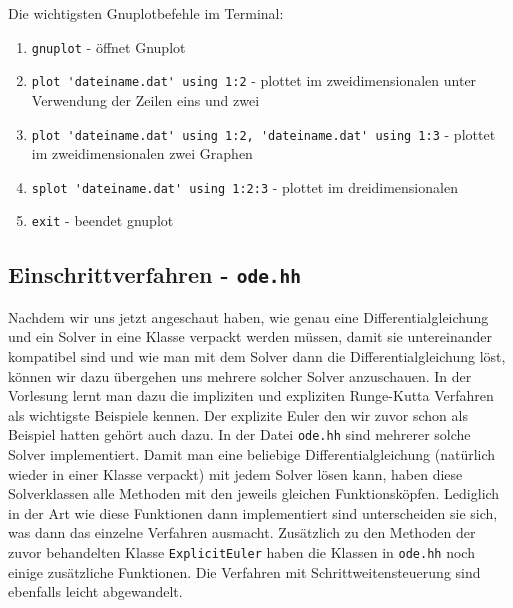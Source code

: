 \documentclass[a4paper,11pt]{article}
\theoremstyle{definition}
\begin{document}
Die wichtigsten Gnuplotbefehle im Terminal:
\begin{enumerate}
\item \lstinline{gnuplot} - öffnet Gnuplot
\item \lstinline{plot 'dateiname.dat' using 1:2} - plottet im zweidimensionalen unter Verwendung der Zeilen eins und zwei
\item \lstinline{plot 'dateiname.dat' using 1:2, 'dateiname.dat' using 1:3} - plottet im zweidimensionalen zwei Graphen
\item \lstinline{splot 'dateiname.dat' using 1:2:3} - plottet im dreidimensionalen
\item \lstinline{exit} - beendet gnuplot
\end{enumerate}


\subsection{Einschrittverfahren - \lstinline{ode.hh}}

Nachdem wir uns jetzt angeschaut haben, wie genau eine
Differentialgleichung und ein Solver in eine Klasse verpackt werden
müssen, damit sie untereinander kompatibel sind und wie man mit dem
Solver dann die Differentialgleichung löst, können wir dazu übergehen
uns mehrere solcher Solver anzuschauen. In der Vorlesung lernt man
dazu die impliziten und expliziten Runge-Kutta Verfahren als
wichtigste Beispiele kennen. Der explizite Euler den wir zuvor schon
als Beispiel hatten gehört auch dazu. In der Datei \lstinline{ode.hh}
sind mehrerer solche Solver implementiert. Damit man eine beliebige
Differentialgleichung (natürlich wieder in einer Klasse verpackt) mit
jedem Solver lösen kann, haben diese Solverklassen alle Methoden mit
den jeweils gleichen Funktionsköpfen. Lediglich in der Art wie diese
Funktionen dann implementiert sind unterscheiden sie sich, was dann
das einzelne Verfahren ausmacht.  Zusätzlich zu den Methoden der zuvor
behandelten Klasse \lstinline{ExplicitEuler} haben die Klassen in
\lstinline{ode.hh} noch einige zusätzliche Funktionen. Die Verfahren
mit Schrittweitensteuerung sind ebenfalls leicht abgewandelt.
\end{document}
